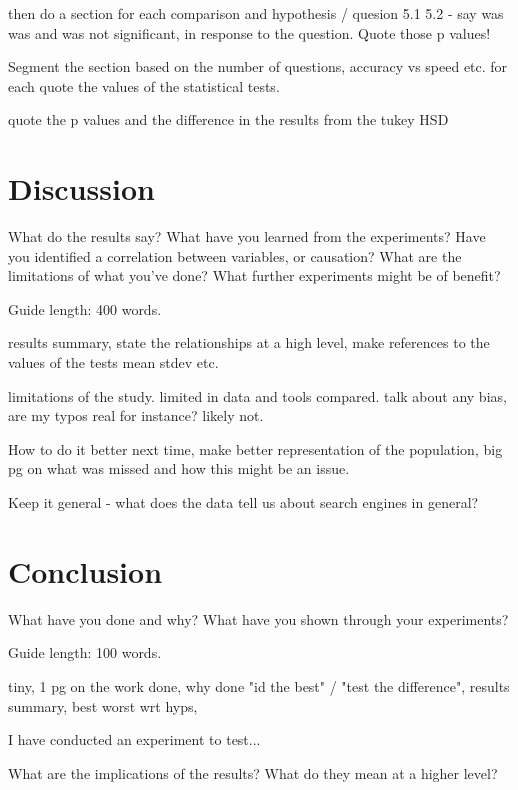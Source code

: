 \documentclass{csfourzero}
\begin{document}
then do a section for each comparison and hypothesis / quesion 5.1 5.2 - say was was and was not significant, in response to the question. Quote those p values!

Segment the section based on the number of questions, accuracy vs speed etc. for each quote the values of the statistical tests.

quote the p values and the difference in the results from the tukey HSD

\section{Discussion}
\label{sec:discuss}

What do the results say? What have you learned from the
experiments? Have you identified a correlation between variables, or
causation? What are the limitations of what you've done? What further
experiments might be of benefit?

Guide length: 400 words.

results summary, state the relationships at a high level, make references to the values of the tests mean stdev etc.

limitations of the study. limited in data and tools compared. talk about any bias, are my typos real for instance? likely not.

How to do it better next time, make better representation of the population, big pg on what was missed and how this might be an issue.

Keep it general - what does the data tell us about search engines in general?

\section{Conclusion}
\label{sec:conc}

What have you done and why? What have you shown through your
experiments?

Guide length: 100 words.

tiny, 1 pg on the work done, why done "id the best" / "test the difference", results summary, best worst wrt hyps,

I have conducted an experiment to test...

What are the implications of the results? What do they mean at a higher level?


\end{document}
